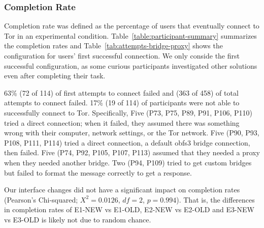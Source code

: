 \documentclass[USenglish,oneside,twocolumn]{article}
\begin{document}
\subsubsection{Completion Rate} 
{\color {blue} 
Completion rate was defined as the percentage of users that eventually connect to Tor in an experimental condition. Table~\ref{table:participant-summary} summarizes the completion rates and Table~\ref{tab:attempts-bridge-proxy} shows the configuration for users' first successful connection. We only conside the first successful configuration, as some curious participants investigated other solutions even after completing their task. 

63\% (72 of 114) of first attempts to connect failed and (363 of 458) of total attempts to connect failed. 17\% (19 of 114) of participants were not able to successfully connect to Tor.  Specifically, Five (P73, P75, P89, P91, P106, P110) tried a direct connection; when it failed, they assumed there was something wrong with their computer, network settings, or the Tor network. Five (P90, P93, P108, P111, P114) tried a direct connection, a default obfs3 bridge connection, then failed. Five (P74, P92, P105, P107, P113) assumed that they needed a proxy when they needed another bridge. Two (P94, P109) tried to get custom bridges but failed to format the message correctly to get a response.

Our interface changes did not have a significant impact on completion rates (Pearson's Chi-squared; $X^2 = 0.0126$, $df = 2$, $p = 0.994$). That is, the differences in completion rates of E1-NEW vs E1-OLD, E2-NEW vs E2-OLD and E3-NEW vs E3-OLD is likely not due to random chance.
}

\begin{table}[t]
\centering

\caption{
Bridge--proxy combinations that led to the first successful bootstrap
in each environment and interface.
Most E1 participants used a direct connection,
but a few tried a built-in obfs3 bridge.
All the E2 participants who succeeded,
did so with obfs3 (the recommended bridge type)---none tried
a different bridge before obfs3.
All of the successful E3 participants but one
used one of the meek bridges.
The remaining E3 participant succeeded in an unexpected way:
by searching the web for an open proxy and configuring it
as the proxy setting.
}
\label{tab:attempts-bridge-proxy}
\end{table}
\end{document}
